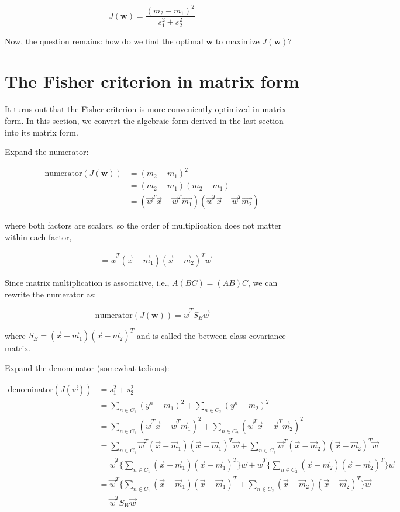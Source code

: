 \documentclass[12pt]{article}
\begin{document}
	$$J(\boldsymbol{w}) = \frac{(m_2 - m_1)^2}{s_1^2+s_2^2}$$
	
	Now, the question remains: how do we find the optimal $\boldsymbol{w}$ to maximize $J(\boldsymbol{w})$?
	
	\section{The Fisher criterion in matrix form}
	
	It turns out that the Fisher criterion is more conveniently optimized in matrix form. In this section, we convert the algebraic form derived in the last section into its matrix form.
	
	Expand the numerator:
	
	\begin{align}
	\text{numerator}(J(\boldsymbol{w}))
	&= (m_2 - m_1)^2 \\	
	&= (m_2 - m_1)(m_2 - m_1) \\
	&= (\vec{w}^T \vec{x} - \vec{w}^T\vec{m_1}) (\vec{w}^T \vec{x} - \vec{w}^T\vec{m_2})
	\end{align}
	
	where both factors are scalars, so the order of multiplication does not matter within each factor,
	
	\begin{align}
	&= \vec{w}^T (\vec{x} - \vec{m}_1) (\vec{x} - \vec{m}_2)^T \vec{w}
	\end{align}
	
	Since matrix multiplication is associative, i.e., $A(BC) = (AB) C$, we can rewrite the numerator as:
	
	$$\text{numerator}(J(\boldsymbol{w})) = \vec{w}^T S_B \vec{w}$$
	
	where $S_B = (\vec{x} - \vec{m}_1) (\vec{x} - \vec{m}_2)^T $ and is called the between-class covariance matrix.
	
	Expand the denominator (somewhat tedious):
	
	\begin{align}
		\text{denominator}(J(\vec{w}))
		&= s_1 ^ 2 + s_2 ^2  \\
		&= \sum_{n \in C_1}(y^n - m_1)^2 + \sum_{n \in C_2}(y^n - m_2)^2 \\
		&= 
		 \sum_{n \in C_1} (\vec{w}^T \vec{x} - \vec{w}^T \vec{m}_1) ^ 2 +
		 \sum_{n \in C_2} (\vec{w}^T \vec{x} - \vec{x}^T \vec{m}_2) ^ 2 \\
		 &= 
		 \sum_{n \in C_1} \vec{w}^T (\vec{x} - \vec{m}_1) (\vec{x} - \vec{m}_1)^T \vec{w} + 
		 \sum_{n \in C_2} \vec{w}^T (\vec{x} - \vec{m}_2) (\vec{x} - \vec{m}_2)^T \vec{w} \\
		&=
		\vec{w}^T \{ \sum_{n \in C_1}  (\vec{x} - \vec{m}_1) (\vec{x} - \vec{m}_1)^T \} \vec{w} +
	    \vec{w}^T \{ \sum_{n \in C_2}  (\vec{x} - \vec{m}_2) (\vec{x} - \vec{m}_2)^T \} \vec{w} \\
	    &= 
	    \vec{w}^T
	    \{
	    \sum_{n \in C_1}  (\vec{x} - \vec{m}_1) (\vec{x} - \vec{m}_1)^T+
	    \sum_{n \in C_2}  (\vec{x} - \vec{m}_2) (\vec{x} - \vec{m}_2)^T
	    \}
	   	\vec{w} \\
		&= \vec{w}^T S_W \vec{w}
	\end{align}
		
\end{document}
